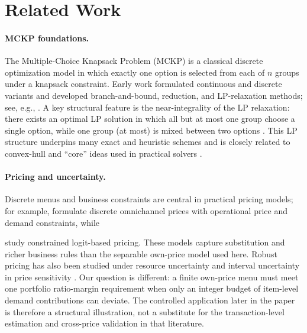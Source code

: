 \documentclass[11pt, a4paper]{article}
\newif\ifblind
\theoremstyle{plain}
\theoremstyle{definition}
\theoremstyle{remark}
\begin{document}
\section{Related Work}
\label{sec:related_work}

\paragraph{MCKP foundations.}
The Multiple-Choice Knapsack Problem (MCKP) is a classical discrete optimization model in which exactly one option is selected from each of $n$
groups under a knapsack constraint. Early work formulated continuous and discrete variants and developed branch-and-bound, reduction, and
LP-relaxation methods; see, e.g., \citet{Nauss1978,Ibaraki1978,Sinha1979}. A key structural feature is the near-integrality of the LP relaxation:
there exists an optimal LP solution in which all but at most one group choose a single option, while one group (at most) is mixed between
two options \citep{Dyer1984}. This LP structure underpins many exact and heuristic schemes and is closely related to convex-hull and ``core''
ideas used in practical solvers \citep{Pisinger1995,Kellerer2004}.

\paragraph{Pricing and uncertainty.}
Discrete menus and business constraints are central in practical pricing models; for example, \citet{Harsha2019} formulate discrete
omnichannel prices with operational price and demand constraints, while
\ifblind recent work studies constrained logit-based pricing.\else
\citet{ShaoMaiCheng2026} study constrained logit-based pricing.\fi
These models capture substitution and richer business rules than the separable own-price model used here.  Robust pricing has also been
studied under resource uncertainty \citep{Thiele2009} and interval uncertainty in price sensitivity \citep{Hamzeei2022}.  Our question is
different: a finite own-price menu must meet one portfolio ratio-margin requirement when only an integer budget of item-level demand
contributions can deviate.  The controlled application later in the paper is therefore a structural illustration, not a substitute for the
transaction-level estimation and cross-price validation in that literature.
\end{document}
